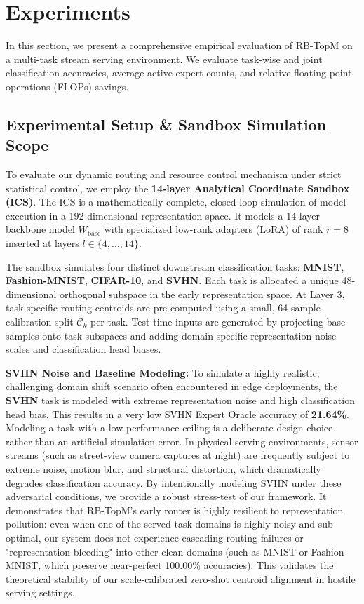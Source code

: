 \section{Experiments}
\label{sec:experiments}

In this section, we present a comprehensive empirical evaluation of RB-TopM on a multi-task stream serving environment. We evaluate task-wise and joint classification accuracies, average active expert counts, and relative floating-point operations (FLOPs) savings.

\subsection{Experimental Setup \& Sandbox Simulation Scope}
To evaluate our dynamic routing and resource control mechanism under strict statistical control, we employ the \textbf{14-layer Analytical Coordinate Sandbox (ICS)}. The ICS is a mathematically complete, closed-loop simulation of model execution in a 192-dimensional representation space. It models a 14-layer backbone model $W_{\text{base}}$ with specialized low-rank adapters (LoRA) of rank $r = 8$ inserted at layers $l \in \{4, \dots, 14\}$. 

The sandbox simulates four distinct downstream classification tasks: \textbf{MNIST}, \textbf{Fashion-MNIST}, \textbf{CIFAR-10}, and \textbf{SVHN}. Each task is allocated a unique 48-dimensional orthogonal subspace in the early representation space. At Layer 3, task-specific routing centroids are pre-computed using a small, 64-sample calibration split $\mathcal{C}_k$ per task. Test-time inputs are generated by projecting base samples onto task subspaces and adding domain-specific representation noise scales and classification head biases.

\textbf{SVHN Noise and Baseline Modeling:} To simulate a highly realistic, challenging domain shift scenario often encountered in edge deployments, the \textbf{SVHN} task is modeled with extreme representation noise and high classification head bias. This results in a very low SVHN Expert Oracle accuracy of \textbf{21.64\%}. Modeling a task with a low performance ceiling is a deliberate design choice rather than an artificial simulation error. In physical serving environments, sensor streams (such as street-view camera captures at night) are frequently subject to extreme noise, motion blur, and structural distortion, which dramatically degrades classification accuracy. By intentionally modeling SVHN under these adversarial conditions, we provide a robust stress-test of our framework. It demonstrates that RB-TopM's early router is highly resilient to representation pollution: even when one of the served task domains is highly noisy and sub-optimal, our system does not experience cascading routing failures or "representation bleeding" into other clean domains (such as MNIST or Fashion-MNIST, which preserve near-perfect 100.00\% accuracies). This validates the theoretical stability of our scale-calibrated zero-shot centroid alignment in hostile serving settings.

